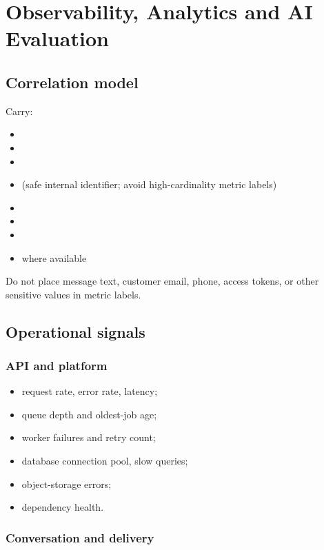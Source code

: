 \chapter{Observability, Analytics and AI Evaluation}

\section{Correlation model}

Carry:

\begin{itemize}
\item {}
\item {}
\item {}
\item {} (safe internal identifier; avoid high-cardinality metric labels)
\item {}
\item {}
\item {}
\item {} where available
\end{itemize}
Do not place message text, customer email, phone, access tokens, or other sensitive values in metric labels.

\section{Operational signals}

\subsection{API and platform}

\begin{itemize}
\item request rate, error rate, latency;
\item queue depth and oldest-job age;
\item worker failures and retry count;
\item database connection pool, slow queries;
\item object-storage errors;
\item dependency health.
\end{itemize}
\subsection{Conversation and delivery}

